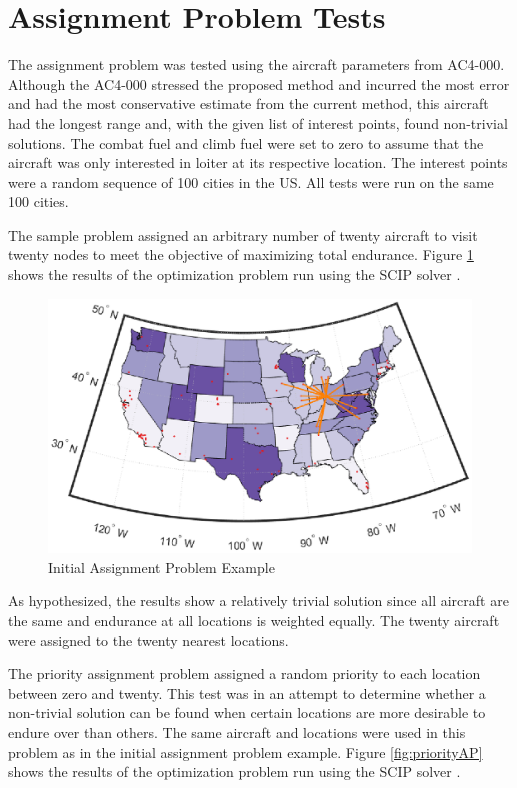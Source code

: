 \section{Assignment Problem Tests}
The assignment problem was tested using the aircraft parameters from AC4-000. Although the AC4-000 stressed the proposed method and incurred the most error and had the most conservative estimate from the current method, this aircraft had the longest range and, with the given list of interest points, found non-trivial solutions. The combat fuel and climb fuel were set to zero to assume that the aircraft was only interested in loiter at its respective location. The interest points were a random sequence of 100 cities in the US. All tests were run on the same 100 cities. \par
The sample problem assigned an arbitrary number of twenty aircraft to visit twenty nodes to meet the objective of maximizing total endurance. Figure \ref{fig:trivialAP} shows the results of the optimization problem run using the SCIP solver \cite{scip}.\par
\begin{figure}[H]
    \centering
    \includegraphics{Thesis/Method_II/trivialAP.eps}
    \caption{Initial Assignment Problem Example}
    \label{fig:trivialAP}
\end{figure}
As hypothesized, the results show a relatively trivial solution since all aircraft are the same and endurance at all locations is weighted equally. The twenty aircraft were assigned to the twenty nearest locations.\par
The priority assignment problem assigned a random priority to each location between zero and twenty. This test was in an attempt to determine whether a non-trivial solution can be found when certain locations are more desirable to endure over than others. The same aircraft and locations were used in this problem as in the initial assignment problem example. Figure \ref{fig:priorityAP} shows the results of the optimization problem run using the SCIP solver \cite{scip}.
